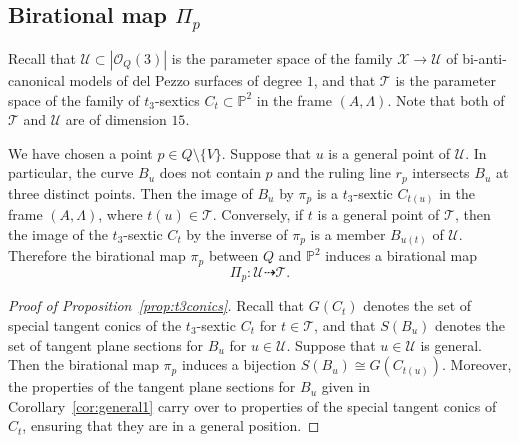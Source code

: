 \documentclass{math}
\theoremstyle{plain}
\numberwithin{equation}{section}
\newcommand{\PP}{\mathord{\mathbb  P}}
\newcommand{\OOO}{\mathord{\mathcal O}}
\newcommand{\TTT}{\mathord{\mathcal T}}
\newcommand{\UUU}{\mathord{\mathcal U}}
\newcommand{\XXX}{\mathord{\mathcal X}}
\newcommand{\mtan}[1]{t_{#1}}
\newcommand{\birat}{\dashrightarrow}
\begin{document}
\subsection{Birational map \texorpdfstring{$\Pi_p$}{Pip}}
\label{subsec:Pip}
%
Recall that  $\UUU\subset |\OOO_{Q}(3)|$ is the parameter space of
the family $\XXX\to \UUU$ of bi-anti-canonical models of del Pezzo surfaces of degree $1$, and that 
 $\TTT$ is the parameter space of the family of $\mtan{3}$-sextics $C_t\subset \PP^2$ 
in the frame $(A, \Lambda)$.
Note that both of $\TTT$ and $\UUU$ are of dimension $15$.
\par
We have chosen a point $p\in Q\setminus\{V\}$.
Suppose that $u$ is a general point of $\UUU$.
In particular, the curve $B_u$ does not contain $p$ and the ruling line $r_p$ intersects $B_u$ 
at three distinct points.
Then the image of  $B_u$ by $\pi_p$ is a $\mtan{3}$-sextic $C_{t(u)}$ in the frame $(A, \Lambda)$,
where $t(u)\in \TTT$.
Conversely, if $t$ is a general point of $\TTT$,
then the image of the $\mtan{3}$-sextic $C_t$ by the inverse of $\pi_p$ is a member $B_{u(t)}$ of $\UUU$.
Therefore
the birational map
$\pi_p$ between $Q$ and $\PP^2$ induces a birational map %
%
\begin{equation}\label{eq:biratUUUTTT}
\Pi_p\colon \UUU\birat\TTT.
\end{equation}
%
%
\begin{proof}[Proof of Proposition~\ref{prop:t3conics}]
Recall that
$G(C_t)$ denotes the set of special tangent conics 
of  the $\mtan{3}$-sextic $C_t$ for $t\in \TTT$, and that
 $S(B_u)$ denotes the set of tangent plane sections for $B_u$ for $u\in \UUU$.
Suppose that $u\in \UUU$ is  general.
Then the  birational map
$\pi_p$ induces a bijection
$S(B_u)\cong G(C_{t(u)})$.
Moreover, 
the properties of the tangent plane sections for $B_u$ 
given in Corollary~\ref{cor:general1} carry over to properties
of the special tangent conics of $C_t$,
ensuring that they are in a general position.
\end{proof}
\end{document}
